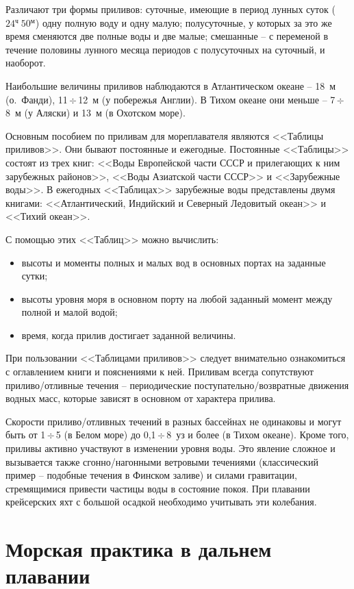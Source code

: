 \documentclass[a4paper, 12pt, twoside, final, book, russian, fittopage, cyremdash]{ncc}
\newcommand{\otdo}{\,\ensuremath{\div}\,}
\newcommand{\tmin}{\ensuremath{^\text{м}}\xspace}
\newcommand{\thr}{\ensuremath{^\text{ч}}\xspace}
\newcommand{\hhmm}[2]{\ensuremath{#1\thr~#2\tmin}}
\begin{document}
Различают три формы приливов: суточные, имеющие в период лунных суток (\hhmm{24}{50}) одну полную воду и одну малую; полусуточные, у которых за это же время сменяются две полные воды и две малые; смешанные \--- с переменой в течение половины лунного месяца периодов с полусуточных на суточный, и наоборот.

Наибольшие величины приливов наблюдаются в Атлантическом океане \--- 18~м (о.~Фанди), 11\otdo 12~м (у побережья Англии). В Тихом океане они меньше \--- 7\otdo 8~м (у Аляски) и 13~м (в Охотском море).

Основным пособием по приливам для мореплавателя являются <<Таблицы приливов>>. Они бывают постоянные и ежегодные. Постоянные <<Таблицы>> состоят из трех книг: <<Воды Европейской части СССР и прилегающих к ним зарубежных районов>>, <<Воды Азиатской части СССР>> и <<Зарубежные воды>>. В ежегодных <<Таблицах>> зарубежные воды представлены двумя книгами: <<Атлантический, Индийский и Северный Ледовитый океан>> и <<Тихий океан>>.

С помощью этих <<Таблиц>> можно вычислить:
\begin{itemize}
\item высоты и моменты полных и малых вод в основных портах на заданные сутки; 
\item высоты уровня моря в основном порту на любой заданный момент между полной и малой водой; 
\item время, когда прилив достигает заданной величины. 
\end{itemize}

При пользовании <<Таблицами приливов>> следует внимательно ознакомиться с оглавлением книги и пояснениями к ней.
Приливам всегда сопутствуют приливо\-/отливные течения \--- периодические поступательно\-/возвратные движения водных масс, которые зависят в основном от характера прилива.

Скорости приливо\-/отливных течений в разных бассейнах не одинаковы и могут быть от 1\otdo 5 (в Белом море) до 0,1\otdo 8~уз и более (в Тихом океане). Кроме того, приливы активно участвуют в изменении уровня воды. Это явление сложное и вызывается также сгонно\-/нагонными ветровыми течениями (классический пример \--- подобные течения в Финском заливе) и силами гравитации, стремящимися привести частицы воды в состояние покоя. При плавании крейсерских яхт с большой осадкой необходимо учитывать эти колебания.

\chapter{Морская практика в дальнем плавании}
\end{document}
